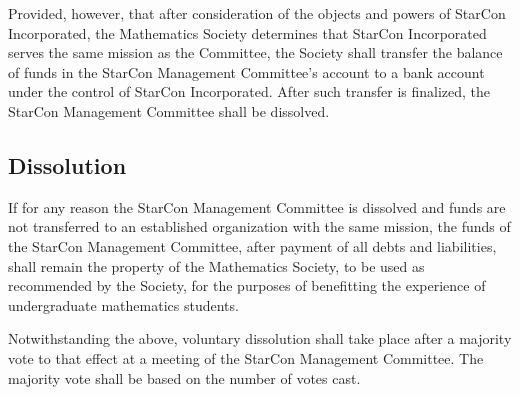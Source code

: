 Provided, however, that after consideration of the objects and powers of StarCon Incorporated, the Mathematics Society determines that StarCon Incorporated serves the same mission as the Committee, the Society shall transfer the balance of funds in the StarCon Management Committee’s account to a bank account under the control of StarCon Incorporated. After such transfer is finalized, the StarCon Management Committee shall be dissolved.

\subsection{Dissolution}
If for any reason the StarCon Management Committee is dissolved and funds are not
transferred to an established organization with the same mission, the funds of the StarCon Management Committee, after payment of all debts and liabilities, shall remain the property of the Mathematics Society, to be used as recommended by the Society, for the purposes of benefitting the experience of undergraduate mathematics students.

Notwithstanding the above, voluntary dissolution shall take place after a majority vote to that effect at a meeting of the StarCon Management Committee. The majority vote shall be based on the number of votes cast.